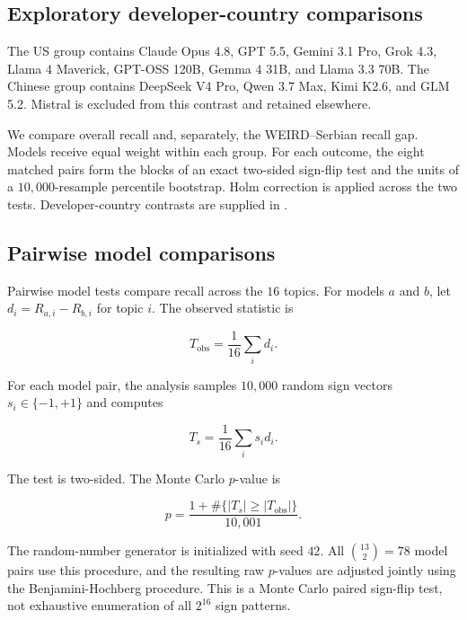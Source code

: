 \documentclass[11pt,a4paper]{article}
\begin{document}
\subsection{Exploratory developer-country comparisons}
\label{app:country-tests}
The US group contains Claude Opus 4.8, GPT 5.5, Gemini 3.1 Pro, Grok 4.3, Llama 4 Maverick, GPT-OSS 120B, Gemma 4 31B, and Llama 3.3 70B. The Chinese group contains DeepSeek V4 Pro, Qwen 3.7 Max, Kimi K2.6, and GLM 5.2. Mistral is excluded from this contrast and retained elsewhere.

We compare overall recall and, separately, the WEIRD--Serbian recall gap. Models receive equal weight within each group. For each outcome, the eight matched pairs form the blocks of an exact two-sided sign-flip test and the units of a $10{,}000$-resample percentile bootstrap. Holm correction is applied across the two tests. Developer-country contrasts are supplied in .

\subsection{Pairwise model comparisons}
\label{app:model_pair_tests}

Pairwise model tests compare recall across the $16$ topics. For models $a$ and $b$, let $d_i=R_{a,i}-R_{b,i}$ for topic $i$. The observed statistic is

\begin{equation}
 T_{\mathrm{obs}}=\frac{1}{16}\sum_i d_i.
\end{equation}

For each model pair, the analysis samples $10,000$ random sign vectors $s_i\in\{-1,+1\}$ and computes

\begin{equation}
 T_s=\frac{1}{16}\sum_i s_i d_i.
\end{equation}

The test is two-sided. The Monte Carlo $p$-value is

\begin{equation}
 p=\frac{1+\#\{|T_s|\geq|T_{\mathrm{obs}}|\}}{10{,}001}.
\end{equation}

The random-number generator is initialized with seed $42$. All $\binom{13}{2}=78$ model pairs use this procedure, and the resulting raw $p$-values are adjusted jointly using the Benjamini-Hochberg procedure. This is a Monte Carlo paired sign-flip test, not exhaustive enumeration of all $2^{16}$ sign patterns.
\end{document}
